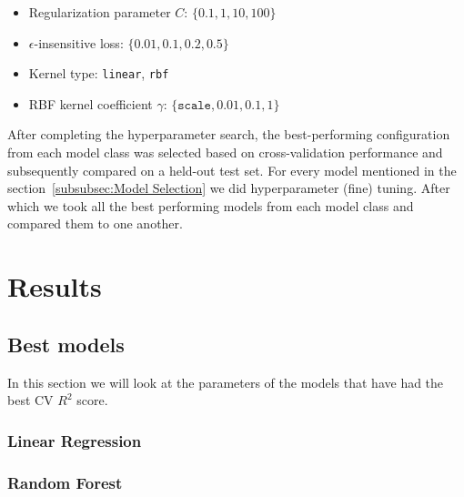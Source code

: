 \documentclass[11pt]{article}
\begin{document}
				\begin{itemize}
					\item Regularization parameter $C$: $\{0.1, 1, 10, 100\}$
					\item $\epsilon$-insensitive loss: $\{0.01, 0.1, 0.2, 0.5\}$
					\item Kernel type: \texttt{linear}, \texttt{rbf}
					\item RBF kernel coefficient $\gamma$: $\{\texttt{scale}, 0.01, 0.1, 1\}$
				\end{itemize}

				\medskip
				\noindent
				After completing the hyperparameter search, the best-performing configuration from each model class was selected based on cross-validation performance and subsequently compared on a held-out test set.
				\noindent For every model mentioned in the section~\ref{subsubsec:Model Selection} we did hyperparameter (fine) tuning.
				After which we took all the best performing models from each model class and compared them to one another.

	\section{Results}
		\subsection{Best models}
			In this section we will look at the parameters of the models that have had the best CV $R^2$ score.
			\subsubsection{Linear Regression}

				\begin{table}[H]
					\centering
					\caption{Best Linear Regression hyperparameters for apartment sale price prediction}
					\label{tab:best_lr_sales}
					
				\end{table}

				\begin{table}[H]
					\centering
					\caption{Best Linear Regression hyperparameters for apartment rental price prediction}
					\label{tab:best_lr_rents}
					
				\end{table}


			\subsubsection{Random Forest}
\end{document}
